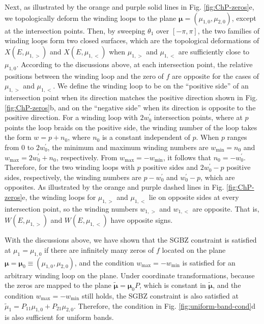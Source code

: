 \documentclass[pdflatex,sn-nature, iicol]{sn-jnl}%
\theoremstyle{thmstyleone}%
\theoremstyle{thmstyletwo}%
\theoremstyle{thmstylethree}%
\begin{document}
Next, as illustrated by the orange and purple solid lines in Fig.
\ref{fig:ChP-zeros}e, we topologically deform the winding loops to
the plane $\boldsymbol{\mu}=(\mu_{1,0},\mu_{2,0})$, except at the
intersection points. Then, by sweeping $\theta_{1}$ over $[-\pi,\pi]$,
the two families of winding loops form two closed surfaces, which
are the topological deformations of $X(E,\mu_{1,>})$ and $X(E,\mu_{1,<})$
when $\mu_{1,>}$ and $\mu_{1,<}$ are sufficiently close to $\mu_{1,0}$.
According to the discussions above, at each intersection point, the
relative positions between the winding loop and the zero of $f$ are
opposite for the cases of $\mu_{1,>}$ and $\mu_{1,<}$. We define
the winding loop to be on the ``positive side'' of an intersection
point when its direction matches the positive direction shown in Fig.
\ref{fig:ChP-zeros}b, and on the ``negative side'' when its direction
is opposite to the positive direction. For a winding loop with $2w_{0}^{\prime}$
intersection points, where at $p$ points the loop braids on the positive
side, the winding number of the loop takes the form $w=p+n_{0}$,
where $n_{0}$ is a constant independent of $p$. When $p$ ranges
from $0$ to $2w_{0}^{\prime}$, the minimum and maximum winding numbers
are $w_{\text{min}}=n_{0}$ and $w_{\text{max}}=2w_{0}^{\prime}+n_{0}$,
respectively. From $w_{\text{max}}=-w_{\text{min}}$, it follows that
$n_{0}=-w_{0}^{\prime}$. Therefore, for the two winding loops with
$p$ positive sides and $2w_{0}^{\prime}-p$ positive sides, respectively,
the winding numbers are $p-w_{0}^{\prime}$ and $w_{0}^{\prime}-p$,
which are opposites. As illustrated by the orange and purple dashed
lines in Fig. \ref{fig:ChP-zeros}e, the winding loops for $\mu_{1,>}$
and $\mu_{1,<}$ lie on opposite sides at every intersection point,
so the winding numbers $w_{1,>}$ and $w_{1,<}$ are opposite. That
is, $W(E,\mu_{1,>})$ and $W(E,\mu_{1,<})$
have opposite signs.

With the discussions above, we have shown that the SGBZ constraint
is satisfied at $\mu_{1}=\mu_{1,0}$ if there are infinitely many
zeros of $f$ located on the plane $\boldsymbol{\mu}=\boldsymbol{\mu}_{0}\equiv(\mu_{1,0},\mu_{2,0})$,
and the condition $w_{\text{max}}=-w_{\text{min}}$ is satisfied for
an arbitrary winding loop on the plane. Under coordinate transformations,
because the zeros are mapped to the plane $\tilde{\boldsymbol{\mu}}=\boldsymbol{\mu}_{0}P$,
which is constant in $\tilde{\boldsymbol{\mu}}$, and the condition
$w_{\text{max}}=-w_{\text{min}}$ still holds, the SGBZ constraint
is also satisfied at $\tilde{\mu}_{1}=P_{11}\mu_{1,0}+P_{21}\mu_{2,0}$.
Therefore, the condition in Fig. \ref{fig:uniform-band-cond}d is
also sufficient for uniform bands.
\end{document}

